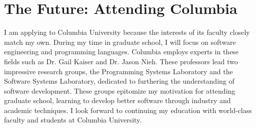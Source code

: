 \section*{The Future: Attending Columbia}
I am applying to Columbia University because the interests of its faculty closely match my own. 
During my time in graduate school, I will focus on software engineering and programming languages. 
Columbia employs experts in these fields such as Dr. Gail Kaiser and Dr. Jason Nieh. 
These professors lead two impressive research groups, the Programming Systems Laboratory and the Software Systems Laboratory, dedicated to furthering the understanding of software development. 
These groups epitomize my motivation for attending graduate school, learning to develop better software through industry and academic techniques. 
I look forward to continuing my education with world-class faculty and students at Columbia University.